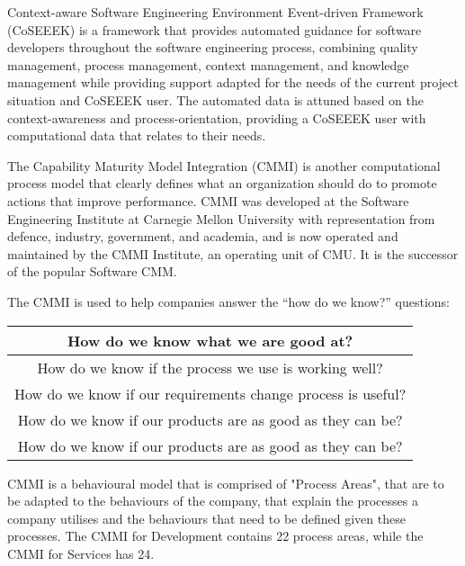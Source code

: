 \documentclass{article}
\begin{document}
Context-aware Software Engineering Environment Event-driven Framework (CoSEEEK) is a framework that provides automated guidance for software developers throughout the software engineering process, combining quality management, process management, context management, and knowledge management while providing support adapted for the needs of the current project situation and CoSEEEK user. The automated data is attuned based on the context-awareness and process-orientation, providing a CoSEEEK user with computational data that relates to their needs. \cite{coseeek} \newline

The Capability Maturity Model Integration (CMMI) is another computational process model that clearly defines what an organization should do to promote actions that improve performance. CMMI was developed at the Software Engineering Institute at Carnegie Mellon University with representation from defence, industry, government, and academia, and is now operated and maintained by the CMMI Institute, an operating unit of CMU. It is the successor of the popular Software CMM. \cite{cmmi} \newline

The CMMI is used to help companies answer the “how do we know?” questions: 

\begin{center}
\begin{tabular}{||c||} 
\hline How do we know what we are good at? \\ 
\hline
How do we know if the process we use is working well? \\ 
\hline
How do we know if our requirements change process is useful? \\
\hline
How do we know if our products are as good as they can be? \\
\hline
How do we know if our products are as good as they can be? \\
\hline
\end{tabular} \newline
\end{center} 

CMMI is a behavioural model that is comprised of "Process Areas", that are to be adapted to the behaviours of the company, that explain the processes a company utilises and the behaviours that need to be defined given these processes. The CMMI for Development contains 22 process areas, while the CMMI for Services has 24. \newline
\end{document}
